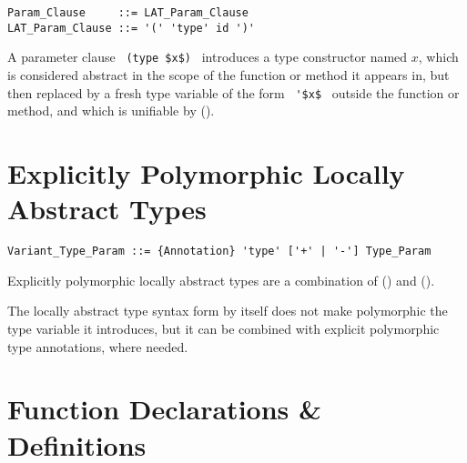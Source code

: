\syntax\begin{lstlisting}
Param_Clause     ::= LAT_Param_Clause
LAT_Param_Clause ::= '(' 'type' id ')'
\end{lstlisting}

A parameter clause ~\lstinline!(type $x$)!~ introduces a type constructor named $x$, which is considered abstract in the scope of the function or method it appears in, but then replaced by a fresh type variable of the form ~\lstinline!'$x$!~ outside the function or method, and which is unifiable by ().





\section{Explicitly Polymorphic Locally Abstract Types}
\label{sec:locally-abstract-polymorphic-types}

\syntax\begin{lstlisting}
Variant_Type_Param ::= {Annotation} 'type' ['+' | '-'] Type_Param
\end{lstlisting}

Explicitly polymorphic locally abstract types are a combination of () and ().

The locally abstract type syntax form by itself does not make polymorphic the type variable it introduces, but it can be combined with explicit polymorphic type annotations, where needed. 





\section{Function Declarations \& Definitions}
\label{sec:function-decls-defs}

